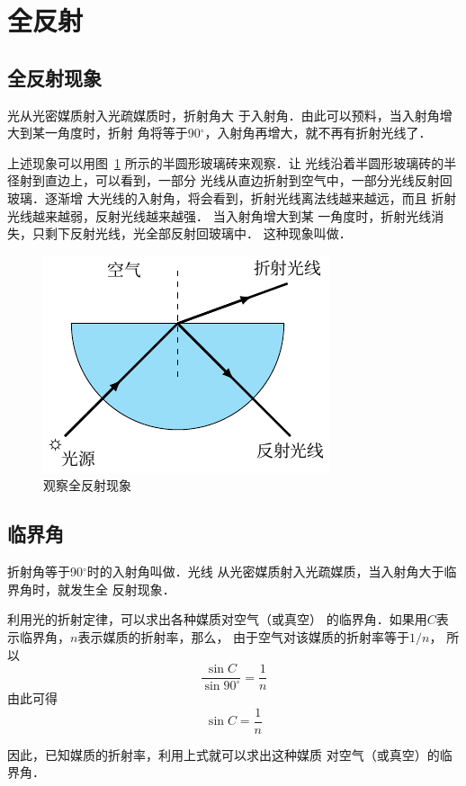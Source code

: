 \section{全反射}
\subsection{全反射现象}

光从光密媒质射入光疏媒质时，折射角大
于入射角．由此可以预料，当入射角增大到某一角度时，折射
角将等于90$^\circ$，入射角再增大，就不再有折射光线了．


上述现象可以用图~\ref{fig_C_5-23} 所示的半圆形玻璃砖来观察．让
光线沿着半圆形玻璃砖的半径射到直边上，可以看到，一部分
光线从直边折射到空气中，一部分光线反射回玻璃．逐渐增
大光线的入射角，将会看到，折射光线离法线越来越远，而且
折射光线越来越弱，反射光线越来越强．
当入射角增大到某
一角度时，折射光线消失，只剩下反射光线，光全部反射回玻璃中．
这种现象叫做．
\begin{figure}[htbp]
	\centering
	\includegraphics{fig/C/5-23.pdf}
	\caption{观察全反射现象}\label{fig_C_5-23}
\end{figure}

\subsection{临界角}

折射角等于90$^\circ$时的入射角叫做．光线
从光密媒质射入光疏媒质，当入射角大于临界角时，就发生全
反射现象．

利用光的折射定律，可以求出各种媒质对空气（或真空）
的临界角．如果用$C$表示临界角，$n$表示媒质的折射率，那么，
由于空气对该媒质的折射率等于$1/n$，
所以
\[\frac{\sin C}{\sin 90^\circ}=\frac{1}{n} \]
由此可得
\[\sin C=\frac{1}{n} \]

因此，已知媒质的折射率，利用上式就可以求出这种媒质
对空气（或真空）的临界角．

